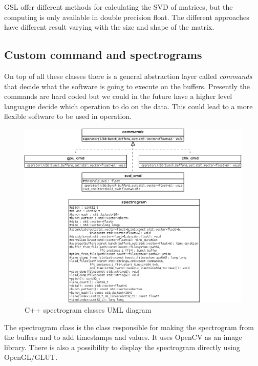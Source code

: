 \Gls{GSL} offer different methods for calculating the \gls{SVD} of matrices, but the computing is only available in double precision float. The different approaches have different result varying with the size and shape of the matrix.

\subsection{Custom command and spectrograms}

On top of all these classes there is a general abstraction layer called \emph{commands} that decide what the software is going to execute on the buffers. Presently the commands are hard coded but we could in the future have a higher level languague decide which operation to do on the data. This could lead to a more flexible software to be used in operation.

\begin{figure}[H]
\centering
\label{fig:spectrogram_uml}
\caption{C++ spectrogram classes UML diagram}
\includegraphics[scale=0.3]{spectrogram_uml.png}
\end{figure}

The spectrogram class is the class responsible for making the spectrogram from the buffers and to add timestamps and values. It uses \gls{OpenCV} as an image library. There is also a possibility to display the spectrogram directly using \gls{OpenGL}/GLUT.


